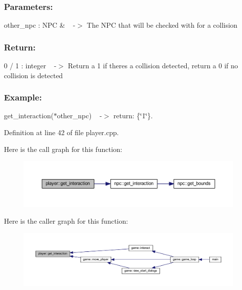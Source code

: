 \subsubsection*{Parameters\+: }

other\+\_\+npc \+: N\+PC \& ~\newline
-\/$>$ The N\+PC that will be checked with for a collision

\subsubsection*{Return\+: }

0 / 1 \+: integer ~\newline
-\/$>$ Return a 1 if there\textquotesingle{}s a collision detected, return a 0 if no collision is detected

\subsubsection*{Example\+: }

get\+\_\+interaction($\ast$other\+\_\+npc) ~\newline
-\/$>$ return\+: \{\char`\"{}1\char`\"{}\}. 

Definition at line 42 of file player.\+cpp.

Here is the call graph for this function\+:
\nopagebreak
\begin{figure}[H]
\begin{center}
\leavevmode
\includegraphics[width=350pt]{classplayer_ad93507550867df5598b86b73de01ec12_cgraph}
\end{center}
\end{figure}
Here is the caller graph for this function\+:
\nopagebreak
\begin{figure}[H]
\begin{center}
\leavevmode
\includegraphics[width=350pt]{classplayer_ad93507550867df5598b86b73de01ec12_icgraph}
\end{center}
\end{figure}
\mbox{\label{classplayer_a78d420774623e89cd896d3cb1d265b17}} 
